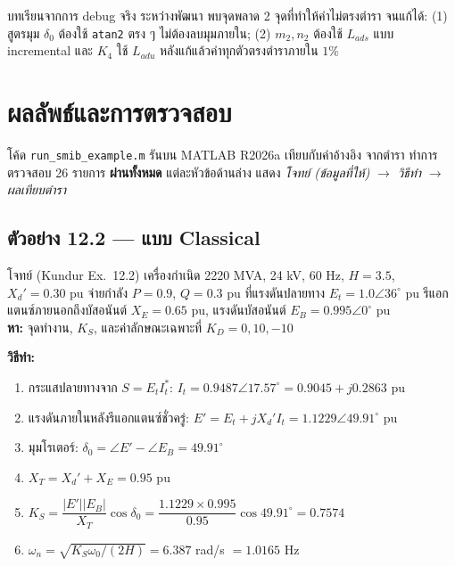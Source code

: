 \documentclass[12pt,a4paper]{article}
\begin{document}
\begin{keybox}{บทเรียนจากการ debug จริง}
ระหว่างพัฒนา พบจุดพลาด 2 จุดที่ทำให้ค่าไม่ตรงตำรา จนแก้ได้:
(1) สูตรมุม $\delta_0$ ต้องใช้ \texttt{atan2} ตรง ๆ ไม่ต้องลบมุมภายใน;
(2) $m_2, n_2$ ต้องใช้ $L_{ads}$ แบบ incremental และ $K_4$ ใช้ $L_{adu}$
หลังแก้แล้วค่าทุกตัวตรงตำราภายใน $1\%$
\end{keybox}

\section{ผลลัพธ์และการตรวจสอบ}

โค้ด \texttt{run\_smib\_example.m} รันบน MATLAB R2026a เทียบกับค่าอ้างอิง
จากตำรา ทำการตรวจสอบ 26 รายการ \textbf{ผ่านทั้งหมด} แต่ละหัวข้อด้านล่าง
แสดง \emph{โจทย์ (ข้อมูลที่ให้)} $\rightarrow$ \emph{วิธีทำ} $\rightarrow$
\emph{ผลเทียบตำรา}

\subsection{ตัวอย่าง 12.2 --- แบบ Classical}

\begin{keybox}{โจทย์ (Kundur Ex.\ 12.2)}
เครื่องกำเนิด 2220 MVA, 24 kV, 60 Hz, $H=3.5$, $X_d'=0.30$ pu จ่ายกำลัง
$P=0.9$, $Q=0.3$ pu ที่แรงดันปลายทาง $E_t=1.0\angle 36^\circ$ pu
รีแอกแตนซ์ภายนอกถึงบัสอนันต์ $X_E=0.65$ pu, แรงดันบัสอนันต์
$E_B=0.995\angle 0^\circ$ pu \\
\textbf{หา:} จุดทำงาน, $K_S$, และค่าลักษณะเฉพาะที่ $K_D=0, 10, -10$
\end{keybox}

\textbf{วิธีทำ:}
\begin{enumerate}
  \item กระแสปลายทางจาก $S=E_t I_t^{*}$:
        $I_t = 0.9487\angle 17.57^\circ = 0.9045 + j0.2863$ pu
  \item แรงดันภายในหลังรีแอกแตนซ์ชั่วครู่:
        $E' = E_t + jX_d' I_t = 1.1229\angle 49.91^\circ$ pu
  \item มุมโรเตอร์: $\delta_0 = \angle E' - \angle E_B = 49.91^\circ$
  \item $X_T = X_d' + X_E = 0.95$ pu
  \item $K_S = \dfrac{|E'||E_B|}{X_T}\cos\delta_0 =
        \dfrac{1.1229\times0.995}{0.95}\cos 49.91^\circ = 0.7574$
  \item $\omega_n = \sqrt{K_S\omega_0/(2H)} = 6.387$ rad/s $= 1.0165$ Hz
\end{enumerate}
\end{document}
